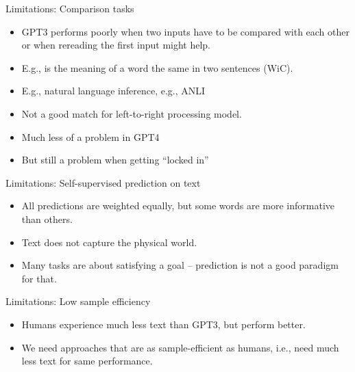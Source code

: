 \documentclass[11pt,compress,t,notes=noshow, xcolor=table]{beamer}
\begin{document}

\begin{frame}{Limitations: Comparison tasks}

\vfill
			
  \begin{itemize}
\item GPT3 performs poorly when two inputs have to be
compared with each other or when rereading the first input
might help.
\item E.g., is the meaning of a word the same in two
sentences (WiC).
\item E.g., natural language inference, e.g., ANLI
\item Not a good match for left-to-right processing model.
\item Much less of a problem in GPT4
\item But still a problem when getting ``locked in'' 
    \end{itemize}

\vfill

\end{frame}


\begin{frame}{Limitations: Self-supervised prediction on text}

\vfill

  \begin{itemize}
\item All predictions are weighted equally, but some
words are more informative than others.
    \item Text does not capture the physical world.
\item Many tasks are about satisfying a goal --
prediction is not a good paradigm for that.
    \end{itemize}

\vfill

\end{frame}


\begin{frame}{Limitations: Low sample efficiency}

\vfill

  \begin{itemize}
    \item Humans experience much less text than GPT3, but
perform better.
    \item We  need approaches that are as
    sample-efficient as humans, i.e., need much less text
    for same performance.

    \end{itemize}

\vfill

\end{frame}
\end{document}
